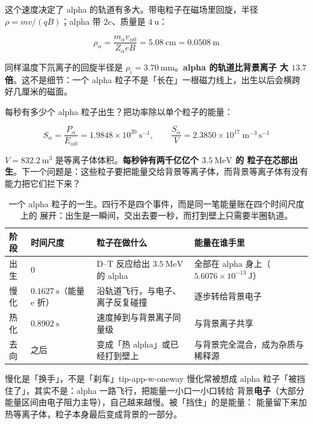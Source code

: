 这个速度决定了 alpha 的轨道有多大。带电粒子在磁场里回旋，半径
$\rho=mv/(qB)$；alpha 带 $2e$、质量是 $4\ \mathrm{u}$：

\begin{equation}
\rho_\alpha = \frac{m_\alpha v_{\alpha 0}}{Z_\alpha e B}
= 5.08\ \mathrm{cm} = 0.0508\ \mathrm{m}
\label{eq:app-w-rho}
\end{equation}

同样温度下氘离子的回旋半径是 $\rho_i=3.70\ \mathrm{mm}$。\textbf{alpha 的轨道比背景离子
大 $13.7$ 倍}。这不是细节：一个 alpha 粒子不是「长在」一根磁力线上，出生以后会横跨
好几厘米的磁面。

每秒有多少个 alpha 粒子出生？把功率除以单个粒子的能量：

\begin{equation}
S_\alpha = \frac{P_\alpha}{E_{\alpha 0}} = 1.9848\times10^{20}\ \mathrm{s^{-1}},
\qquad
\frac{S_\alpha}{V} = 2.3850\times10^{17}\ \mathrm{m^{-3}\,s^{-1}}
\label{eq:app-w-source}
\end{equation}

$V=832.2\ \mathrm{m^3}$ 是等离子体体积。\textbf{每秒钟有两千亿亿个 $3.5\ \mathrm{MeV}$ 的
粒子在芯部出生}。下一个问题是：这些粒子要把能量交给背景等离子体，而背景等离子体有没有
能力把它们拦下来？

\begin{table}[htbp]
\centering
\caption{一个 alpha 粒子的一生。四行不是四个事件，而是同一笔能量账在四个时间尺度上的
展开：出生是一瞬间，交出去要一秒，而打到壁上只需要半圈轨道。}
\label{tab:app-w-life}
\begin{tabular}{@{}p{2.5cm}p{3.0cm}p{3.6cm}p{3.6cm}@{}}
\hline
阶段 & 时间尺度 & 粒子在做什么 & 能量在谁手里 \\
\hline
出生 & $0$ & D--T 反应给出 $3.5\ \mathrm{MeV}$ 的 alpha &
全部在 alpha 身上（$5.6076\times10^{-13}\ \mathrm{J}$） \\
慢化 & $0.1627\ \mathrm{s}$（能量 e 折） &
沿轨道飞行，与电子、离子反复碰撞 & 逐步转给背景电子 \\
热化 & $0.8902\ \mathrm{s}$ &
速度掉到与背景离子同量级 & 与背景离子共享 \\
去向 & 之后 & 变成「热 alpha」或已经打到壁上 &
与背景完全混合，成为杂质与稀释源 \\
\hline
\end{tabular}

\end{table}

\begin{tip}{慢化是「换手」，不是「刹车」}{tip-app-w-oneway}
慢化常被想成 alpha 粒子「被挡住了」，其实不是：alpha 一路飞行，把能量一小口一小口转给
背景\textbf{电子}（大部分能量区间由电子阻力主导），自己越来越慢。被「挡住」的是能量：
能量留下来加热等离子体，粒子本身最后变成背景的一部分。
\end{tip}


